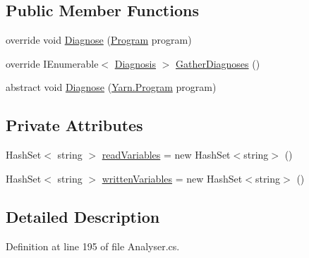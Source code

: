 \subsection*{Public Member Functions}
\begin{DoxyCompactItemize}
\item 
override void \hyperlink{a00185_aeac8f333d4dcc85f4d4a716bf8fea01f}{Diagnose} (\hyperlink{a00152}{Program} program)
\item 
override I\-Enumerable$<$ \hyperlink{a00091}{Diagnosis} $>$ \hyperlink{a00185_a107aecf707b130c4b733930a95f9154e}{Gather\-Diagnoses} ()
\item 
abstract void \hyperlink{a00053_aba4a36cb823b11ee491074e26477d084}{Diagnose} (\hyperlink{a00152}{Yarn.\-Program} program)
\end{DoxyCompactItemize}
\subsection*{Private Attributes}
\begin{DoxyCompactItemize}
\item 
Hash\-Set$<$ string $>$ \hyperlink{a00185_a6b542092ddce1b92c9455d60899518a9}{read\-Variables} = new Hash\-Set$<$string$>$ ()
\item 
Hash\-Set$<$ string $>$ \hyperlink{a00185_a0c2fe6eded1b10b135ca2469f5980a39}{written\-Variables} = new Hash\-Set$<$string$>$ ()
\end{DoxyCompactItemize}


\subsection{Detailed Description}


Definition at line 195 of file Analyser.\-cs.



